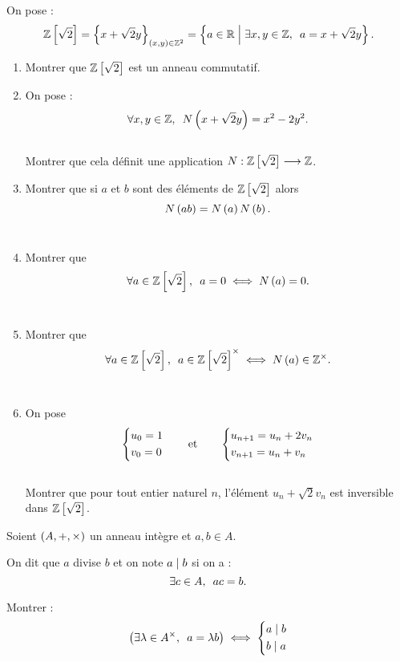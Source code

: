 \begin{exo}[Exercice 16]
On pose : \[\Z\croch{\sqrt{2}}=\accol{x+\sqrt{2}y}_{\paren{x,y}\in\Z^2}=\accol{a\in\R\tq\quantifs{\exists x,y\in\Z}a=x+\sqrt{2}y}.\]

\begin{enumerate}
\item Montrer que \(\mathbb{Z}\left[\sqrt{2}\right]\) est un anneau commutatif. \\

\item On pose : \[\quantifs{\forall x,y\in\Z}N\paren{x+\sqrt{2}y}=x^2-2y^2.\] \\

Montrer que cela définit une application \(N:\mathbb{Z}\left[\sqrt{2}\right]\longrightarrow\mathbb{Z}\). \\

\item Montrer que si \(a\) et \(b\) sont des éléments de \(\mathbb{Z}\left[\sqrt{2}\right]\) alors \[N\left(ab\right)=N\left(a\right)N\left(b\right).\] \\

\item Montrer que \[\quantifs{\forall a\in\Z\croch{\sqrt{2}}}a=0\ssi N\paren{a}=0.\] \\

\item Montrer que \[\quantifs{\forall a\in\Z\croch{\sqrt{2}}}a\in\Z\croch{\sqrt{2}}\croix\ssi N\paren{a}\in\Z\croix.\] \\

\item On pose \[\begin{dcases}u_0=1 \\ v_0=0\end{dcases}\qquad\text{et}\qquad\begin{dcases}u_{n+1}=u_n+2v_n \\ v_{n+1}=u_n+v_n\end{dcases}\] \\

Montrer que pour tout entier naturel \(n\), l'élément \(u_n+\sqrt{2}v_n\) est inversible dans \(\mathbb{Z}\left[\sqrt{2}\right]\).
\end{enumerate}
\end{exo}

\begin{corr}
\end{corr}

\begin{exo}[Exercice 17]
Soient \(\anneau{A}\) un anneau intègre et \(a,b\in A\).

On dit que \(a\) divise \(b\) et on note \(a\mid b\) si on a : \[\quantifs{\exists c\in A}ac=b.\]

Montrer : \[\paren{\quantifs{\exists\lambda\in A\croix}a=\lambda b}\ssi\begin{dcases}a\divise b \\ b\divise a\end{dcases}\]
\end{exo}

